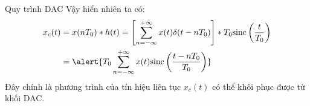\documentclass[8pt]{beamer}
\begin{document}
\begin{frame}{Quy trình DAC}
Vậy hiển nhiên ta có:
\begin{equation*}
\begin{split}
	x_{c}(t)&=x(nT_{0})*h(t)=\left[\sum_{n=-\infty}^{+\infty}x(t)\delta(t-nT_{0})\right]*T_{0}\text{sinc}\left(\frac{t}{T_{0}}\right)\\ &=\alert{T_{0}\sum_{n=-\infty}^{+\infty}x(t)\text{sinc}\left(\frac{t-nT_{0}}{T_{0}}\right)}
\end{split}
\end{equation*}
Đây chính là phương trình của tín hiệu liên tục $x_{c}(t)$ có thể khôi phục được từ khối DAC.
\end{frame}
\end{document}
